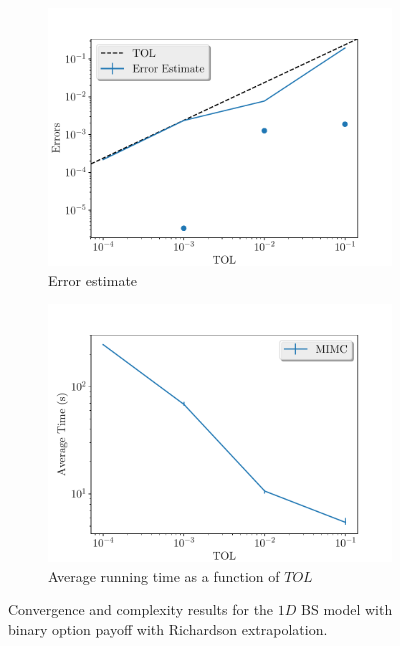 \documentclass[11pt]{article}
\begin{document}
\begin{figure}[!h]
	\centering
	\begin{subfigure}{.5\textwidth}
		\centering
		\includegraphics[width=1\linewidth]{./figures/binary_4_8_steps/error_estimate.pdf}
		\caption{Error estimate}
		\label{fig:misc_binary_4_8_steps_sub1}
	\end{subfigure}%
	\begin{subfigure}{.5\textwidth}
		\centering
		\includegraphics[width=1\linewidth]{./figures/binary_4_8_steps/average_running_time.pdf}
		\caption{Average running time as a function of $TOL$}
		\label{fig:misc_binary_4_8_steps_sub2}
	\end{subfigure}%
	\caption{Convergence and complexity results for the $1D$ BS model with binary option payoff with Richardson extrapolation.}
	\label{fig:misc_binary_4_8_steps_1}
\end{figure}
\end{document}
